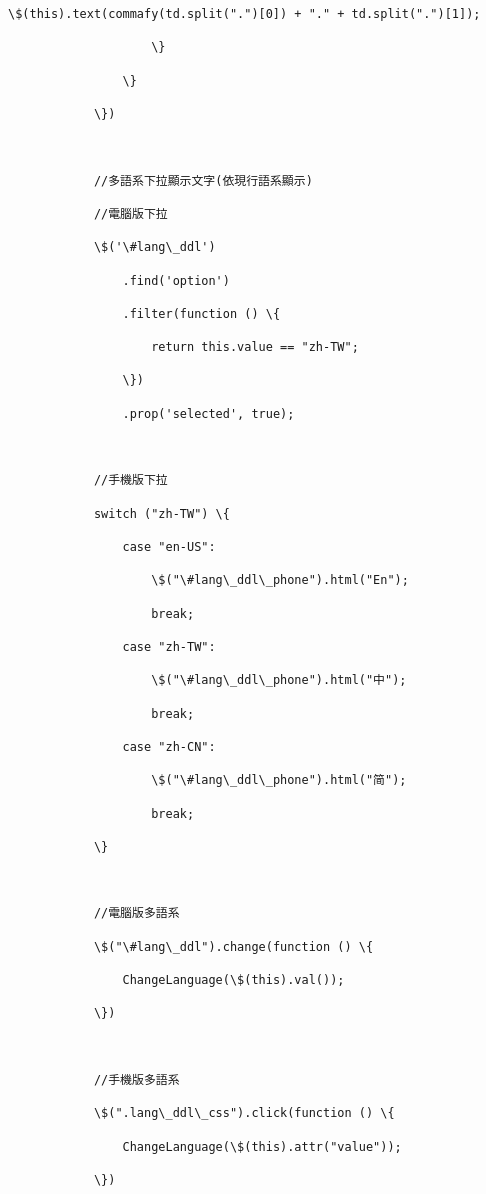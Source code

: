 \documentclass[11pt]{article}
\begin{document}
\begin{Verbatim}[commandchars=\\\{\}]
                        \$(this).text(commafy(td.split(".")[0]) + "." + td.split(".")[1]);

                    \}

                \}

            \})



            //多語系下拉顯示文字(依現行語系顯示)

            //電腦版下拉

            \$('\#lang\_ddl')

                .find('option')

                .filter(function () \{

                    return this.value == "zh-TW";

                \})

                .prop('selected', true);



            //手機版下拉

            switch ("zh-TW") \{

                case "en-US":

                    \$("\#lang\_ddl\_phone").html("En");

                    break;

                case "zh-TW":

                    \$("\#lang\_ddl\_phone").html("中");

                    break;

                case "zh-CN":

                    \$("\#lang\_ddl\_phone").html("简");

                    break;

            \}



            //電腦版多語系

            \$("\#lang\_ddl").change(function () \{

                ChangeLanguage(\$(this).val());

            \})



            //手機版多語系

            \$(".lang\_ddl\_css").click(function () \{

                ChangeLanguage(\$(this).attr("value"));

            \})




\end{Verbatim}
\end{document}
